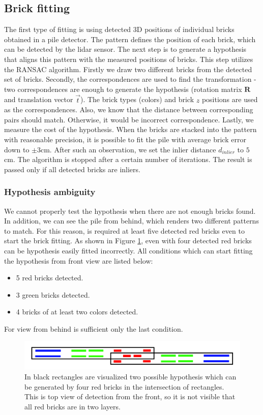\subsection{Brick fitting}
The first type of fitting is using detected 3D positions of individual bricks obtained in a pile detector. The pattern defines the position of each brick, which can be detected by the lidar sensor. The next step is to generate a hypothesis that aligns this pattern with the measured positions of bricks. This step utilizes the RANSAC algorithm. Firstly we draw two different bricks from the detected set of bricks. Secondly, the correspondences are used to find the transformation - two correspondences are enough to generate the hypothesis (rotation matrix $\bm{R}$ and translation vector $\vec{t}$). The brick types (colors) and brick $z$ positions are used as the correspondences. Also, we know that the distance between corresponding pairs should match. Otherwise, it would be incorrect correspondence. Lastly, we measure the cost of the hypothesis. When the bricks are stacked into the pattern with reasonable precision, it is possible to fit the pile with average brick error down to $\pm 3$cm. After such an observation, we set the inlier distance $d_{inlier}$ to $5$cm. The algorithm is stopped after a certain number of iterations. The result is passed only if all detected bricks are inliers.

\subsubsection{Hypothesis ambiguity}
We cannot properly test the hypothesis when there are not enough bricks found. In addition, we can see the pile from behind, which renders two different patterns to match. For this reason, is required at least five detected red bricks even to start the brick fitting. As shown in Figure \ref{fig:ambiguity}, even with four detected red bricks can be hypothesis easily fitted incorrectly. All conditions which can start fitting the hypothesis from front view are listed below:
\begin{itemize}
\item 5 red bricks detected.
\item 3 green bricks detected.
\item 4 bricks of at least two colors detected.
\end{itemize}
For view from behind is sufficient only the last condition.
\begin{figure}[H]
\centering
\includegraphics[scale=0.3]{fig/ambiguous.png}
\caption[Hypothesis ambiguity]{In black rectangles are visualized two possible hypothesis which can be generated by four red bricks in the intersection of rectangles. This is top view of detection from the front, so it is not visible that all red bricks are in two layers.}
\label{fig:ambiguity}
\end{figure}

